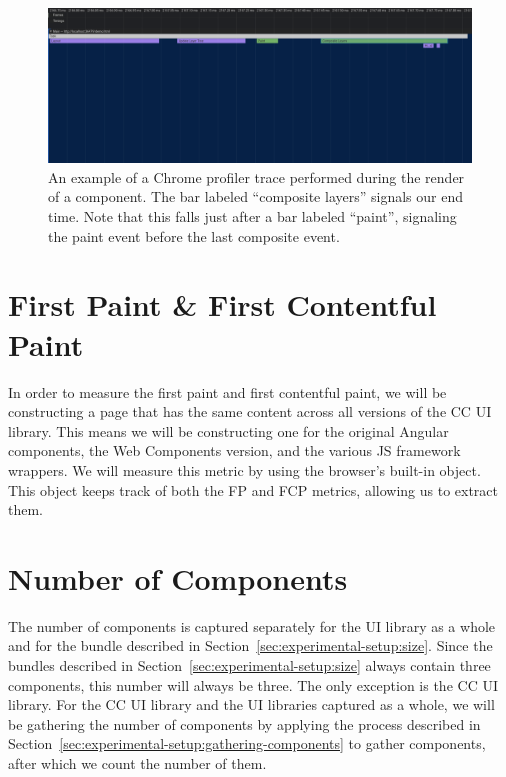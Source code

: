 \begin{figure}[h]
  \includegraphics[width=\columnwidth]{figures/experimental-setup/render-time-zoomed.png}
  \caption{An example of a Chrome profiler trace performed during the render of a component. The bar labeled ``composite layers'' signals our end time. Note that this falls just after a bar labeled ``paint'', signaling the paint event before the last composite event.}
  \label{fig:experimental-setup:render-time-end}
  \centering
\end{figure}

\section{First Paint \& First Contentful Paint}
In order to measure the first paint and first contentful paint, we will be constructing a page that has the same content across all versions of the CC UI library. This means we will be constructing one for the original Angular components, the Web Components version, and the various JS framework wrappers. We will measure this metric by using the browser's built-in  object. This object keeps track of both the FP and FCP metrics, allowing us to extract them.

\section{Number of Components}
The number of components is captured separately for the UI library as a whole and for the bundle described in Section~\ref{sec:experimental-setup:size}. Since the bundles described in Section~\ref{sec:experimental-setup:size} always contain three components, this number will always be three. The only exception is the CC UI library. For the CC UI library and the UI libraries captured as a whole, we will be gathering the number of components by applying the process described in Section~\ref{sec:experimental-setup:gathering-components} to gather components, after which we count the number of them.